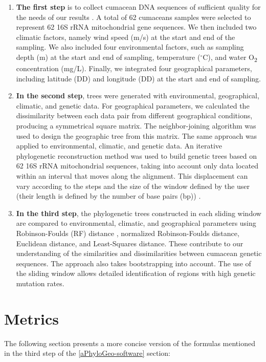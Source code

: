 \begin{enumerate}
\item \textbf{The first step} is to collect cumacean DNA sequences of sufficient quality for the needs of our results \citep{koshkarov_phylogeography_2022}. A total of 62 cumaceans samples were selected to represent 62 16S rRNA mitochondrial gene sequences. We then included two climatic factors, namely wind speed (m/s) at the start and end of the sampling. We also included four environmental factors, such as sampling depth (m) at the start and end of sampling, temperature ($^\circ$C), and water O\textsubscript{2} concentration (mg/L). Finally, we integrated four geographical parameters, including latitude (DD) and longitude (DD) at the start and end of sampling.

\item \textbf{In the second step}, trees were generated with environmental, geographical, climatic, and genetic data. For geographical parameters, we calculated the dissimilarity between each data pair from different geographical conditions, producing a symmetrical square matrix. The neighbor-joining algorithm was used to design the geographic tree from this matrix. The same approach was applied to environmental, climatic, and genetic data. An iterative phylogenetic reconstruction method was used to build genetic trees based on 62 16S rRNA mitochondrial sequences, taking into account only data located within an interval that moves along the alignment. This displacement can vary according to the steps and the size of the window defined by the user (their length is defined by the number of base pairs (bp)) \citep{koshkarov_phylogeography_2022}.

\item \textbf{In the third step}, the phylogenetic trees constructed in each sliding window are compared to environmental, climatic, and geographical parameters using Robinson-Foulds (RF) distance \citep{robinson_comparison_1981, koshkarov_phylogeography_2022}, normalized Robinson-Foulds distance, Euclidean distance, and Least-Squares distance. These contribute to our understanding of the similarities and dissimilarities between cumacean genetic sequences. The approach also takes bootstrapping into account. The use of the sliding window allows detailed identification of regions with high genetic mutation rates.
\end{enumerate}

\section{Metrics}\label{metrics}
The following section presents a more concise version of the formulas mentioned in the third step of the \ref{aPhyloGeo-software} section:

